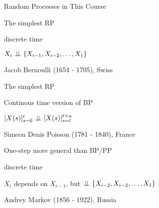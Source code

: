 


\begin{frame}{Random Processes in This Course}

  {
    \scriptsize
    \plitemsep 0.03in
    
    \bci
  \item<1-> The simplest RP
  \item<1-> discrete time 
  \item<2-> $X_i \perp \!\!\! \perp \{X_{i-1}, X_{i-2}, \ldots, X_1 \}$
  \item<3-> 
  \item<10-> 
    \eci

    \vspace{1.2cm}
    \centering
    Jacob Bernoulli (1654 - 1705), Swiss 
  }
  {
    \scriptsize
    \plitemsep 0.03in
    
    \bci
  \item<4-> The simplest RP
  \item<4-> Continous time version of BP
  \item<5-> $[X(s)]_{s=0}^{t} \perp \!\!\! \perp [X(s)]_{s=t}^{t+a}$
  \item<6-> 

\item<10-> 
  \eci

  \vspace{1.2cm}
    \centering
    Simeon Denis Poisson (1781 - 1840), France
  }
  {
    \scriptsize
    \plitemsep 0.03in
    
    \bci
  \item<7-> One-step more general than BP/PP
  \item<7-> discrete time
  \item<8-> $X_i$ depends on $X_{i-1}$, but $\perp \!\!\! \perp \{X_{i-2}, X_{i-2}, \ldots, X_1 \}$
  \item<9-> 
    \item<10-> 
    \eci

  \vspace{0.2cm}
    \centering
    Andrey Markov (1856 - 1922), Russia
  }



\end{frame}


